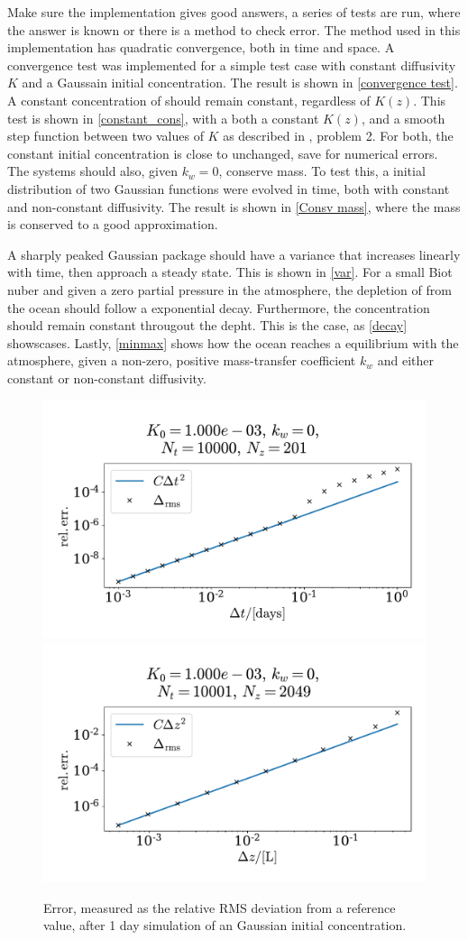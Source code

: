 \documentclass{article}
\begin{document}
    Make sure the implementation gives good answers, a series of tests are run, where the answer is known or there is a method to check error. The method used in this implementation has quadratic convergence, both in time and space. A convergence test was implemented for a simple test case with constant diffusivity $K$ and a Gaussain initial concentration. The result is shown in \autoref{convergence test}. A constant concentration of  should remain constant, regardless of $K(z)$. This test is shown in \autoref{constant_cons}, with a both a constant $K(z)$, and a smooth step function between two values of $K$ as described in \cite{exercise}, problem 2. For both, the constant initial concentration is close to unchanged, save for numerical errors. The systems should also, given $k_w=0$, conserve mass. To test this, a initial distribution of two Gaussian functions were evolved in time, both with constant and non-constant diffusivity. The result is shown in \autoref{Consv mass}, where the mass is conserved to a good approximation. 
    
    A sharply peaked Gaussian package should have a variance that increases linearly with time, then approach a steady state. This is shown in \autoref{var}. For a small Biot nuber and given a zero partial pressure in the atmosphere, the depletion of  from the ocean should follow a exponential decay. Furthermore, the concentration should remain constant througout the depht. This is the case, as \autoref{decay} showscases. Lastly, \autoref{minmax} shows how the ocean reaches a equilibrium with the atmosphere, given a non-zero, positive mass-transfer coefficient $k_w$ and either constant or non-constant diffusivity.

    \begin{figure}
        \centering
        \includegraphics[width=.49\textwidth]{../plots/conv_test_t}
        \includegraphics[width=.49\textwidth]{../plots/conv_test_z}
        \caption{Error, measured as the relative RMS deviation from a reference value, after 1 day simulation of an Gaussian initial concentration.}
        \label{convergence test}
    \end{figure}
\end{document}
